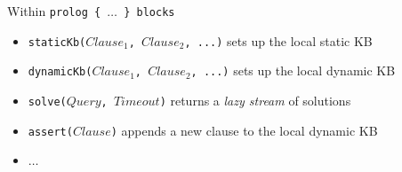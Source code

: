 \documentclass[presentation]{beamer}
\begin{document}
\begin{frame}[allowframebreaks]
    \framebreak

    \begin{block}{Within \texttt{prolog \{ $\ldots$ \} blocks}}
        \begin{itemize}
            \item \alert{\texttt{staticKb($Clause_1$, $Clause_2$, ...)}} sets up the local \alert{static} KB
            \item \alert{\texttt{dynamicKb($Clause_1$, $Clause_2$, ...)}} sets up the local \alert{dynamic} KB
            \item \alert{\texttt{solve($Query$, $Timeout$)}} returns a \emph{lazy stream} of solutions
            \item \alert{\texttt{assert($Clause$)}} appends a new clause to the local \alert{dynamic} KB
            \item $\ldots$
        \end{itemize}
    \end{block}

\end{frame}
\end{document}
